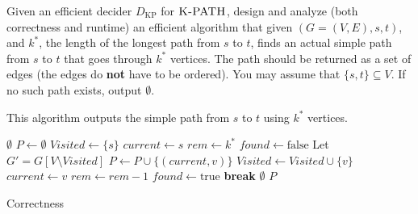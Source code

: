\documentclass[12pt, letterpaper]{article}
\begin{document}
\begin{subproblem}{}
    Given an efficient decider $D_\text{KP}$ for $\textsc{K-PATH}$, design and analyze (both correctness and runtime) an efficient algorithm that given $(G=(V,E),s,t)$, and $k^*$, the length of the longest path from $s$ to $t$, finds an actual simple path\textit{} from $s$ to $t$ that goes through $k^*$ vertices. The path should be returned as a set of edges (the edges do \textbf{not} have to be ordered). You may assume that $\{s,t\} \subseteq V$. If no such path exists, output $\emptyset$.
\end{subproblem}
\begin{problemproof}
    This algorithm outputs the simple path from $s$ to $t$ using $k^*$ vertices.
    \begin{algorithm}[H]
        \caption{ReconstructLongestPath($G=(V,E),\, s,\, t,\, k^*$)}
        \begin{algorithmic}[1]
         \State \Return $\emptyset$
        \EndIf
        \State $P \gets \emptyset$ 
        \State $Visited \gets \{s\}$
        \State $current \gets s$
        \State $rem \gets k^*$ 
         
            \State $found \gets \text{false}$
            \State Let $G' = G[V \setminus Visited]$ 
                    \State $P \gets P \cup \{ (current,v) \}$
                    \State $Visited \gets Visited \cup \{v\}$
                    \State $current \gets v$
                    \State $rem \gets rem - 1$
                    \State $found \gets \text{true}$
                    \State \textbf{break} 
                \EndIf
            \EndFor
                \State \Return $\emptyset$ 
            \EndIf
        \EndWhile
        \State \Return $P$
        \end{algorithmic}
    \end{algorithm}
    Correctness
    

\end{problemproof}
\end{document}
